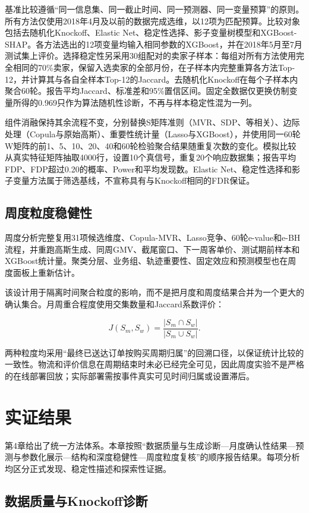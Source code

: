 \documentclass{sufethesismas}
\begin{document}
基准比较遵循``同一信息集、同一截止时间、同一预测器、同一变量预算''的原则。所有方法仅使用2018年4月及以前的数据完成选维，以12项为匹配预算。比较对象包括去随机化Knockoff、Elastic Net、稳定性选择、影子变量树模型和XGBoost-SHAP。各方法选出的12项变量均输入相同参数的XGBoost，并在2018年5月至7月测试集上评价。选择稳定性另采用30组配对的卖家子样本：每组对所有方法使用完全相同的70\%卖家，保留入选卖家的全部月份，在子样本内完整重算各方法Top-12，并计算其与各自全样本Top-12的Jaccard。去随机化Knockoff在每个子样本内聚合60轮。报告平均Jaccard、标准差和95\%置信区间。固定全数据仅更换仿制变量所得的0.969只作为算法随机性诊断，不再与样本稳定性混为一列。

组件消融保持其余流程不变，分别替换S矩阵准则（MVR、SDP、等相关）、边际处理（Copula与原始高斯）、重要性统计量（Lasso与XGBoost），并使用同一60轮W矩阵的前1、5、10、20、40和60轮检验聚合结果随重复次数的变化。模拟比较从真实特征矩阵抽取4000行，设置10个真信号，重复20个响应数据集；报告平均FDP、FDP超过0.20的概率、Power和平均发现数。Elastic Net、稳定性选择和影子变量方法属于筛选基线，不宣称具有与Knockoff相同的FDR保证。

\section{周度粒度稳健性}

周度分析完整复用31项候选维度、Copula-MVR、Lasso竞争、60轮e-value和e-BH流程，并重跑高斯生成、同周GMV、截尾窗口、下一周客单价、测试期前样本和XGBoost统计量。聚类分层、业务组、轨迹重要性、固定效应和预测模型也在周度面板上重新估计。

该设计用于隔离时间聚合粒度的影响，而不是把月度和周度结果合并为一个更大的确认集合。月周重合程度使用交集数量和Jaccard系数评价：

\[
J(S_m,S_w)=\frac{|S_m\cap S_w|}{|S_m\cup S_w|}.
\]

两种粒度均采用``最终已送达订单按购买周期归属''的回溯口径，以保证统计比较的一致性。物流和评价信息在周期结束时未必已经完全可见，因此周度实验不是严格的在线部署回放；实际部署需按事件真实可见时间归属或设置滞后。

\chapter{实证结果}

第4章给出了统一方法体系。本章按照``数据质量与生成诊断---月度确认性结果---预测与参数化展示---结构和深度稳健性---周度粒度复核''的顺序报告结果。每项分析均区分正式发现、稳定性描述和探索性证据。

\section{数据质量与Knockoff诊断}
\end{document}
